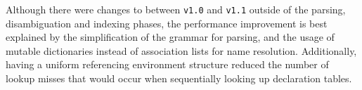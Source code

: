 Although there were changes to \Beluga between \texttt{v1.0} and \texttt{v1.1} outside of the parsing, disambiguation and indexing phases, the performance improvement is best explained by the simplification of the grammar for parsing, and the usage of mutable dictionaries instead of association lists for name resolution.
Additionally, having a uniform referencing environment structure reduced the number of lookup misses that would occur when sequentially looking up declaration tables.








